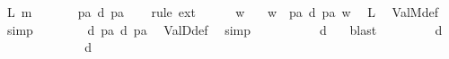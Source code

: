 \begin{isabellebody}
\ L{\isacharcolon}{\kern0pt}\ {\isachardoublequoteopen}{\isasymTurnstile}\isactrlsup m\ {\isasympsi}{\isachardoublequoteclose}\isanewline
\ \ \isamarkupfalse%
\ {\isachardoublequoteopen}{\isasympsi}\ {\isacharequal}{\kern0pt}\ {\isasymlceil}p\isactrlsup a\ {\isasymsupset}\isactrlsup d\ p\isactrlsup a{\isasymrceil}{\isachardoublequoteclose}\isanewline
\ \ \isamarkupfalse%
\ {\isacharparenleft}{\kern0pt}rule\ ext{\isacharparenright}{\kern0pt}\isanewline
\ \ \ \ \isamarkupfalse%
\ w\ \isamarkupfalse%
\ {\isachardoublequoteopen}{\isasympsi}\ w\ {\isacharequal}{\kern0pt}\ {\isasymlceil}p\isactrlsup a\ {\isasymsupset}\isactrlsup d\ p\isactrlsup a{\isasymrceil}\ w{\isachardoublequoteclose}\ \isamarkupfalse%
\ L\ \isamarkupfalse%
\ ValM{\isacharunderscore}{\kern0pt}def\ \isamarkupfalse%
\ simp\isanewline
\ \ \isamarkupfalse%
\isanewline
\ \ \isamarkupfalse%
\ \isamarkupfalse%
\ {\isachardoublequoteopen}{\isasymTurnstile}\isactrlsup d\ {\isacharparenleft}{\kern0pt}p\isactrlsup a\ {\isasymsupset}\isactrlsup d\ p\isactrlsup a{\isacharparenright}{\kern0pt}{\isachardoublequoteclose}\ \isamarkupfalse%
\ ValD{\isacharunderscore}{\kern0pt}def\ \isamarkupfalse%
\ simp\isanewline
\ \ \isamarkupfalse%
\ \isamarkupfalse%
\ {\isachardoublequoteopen}{\isasymexists}{\isasymphi}{\isachardot}{\kern0pt}\ {\isasympsi}\ {\isacharequal}{\kern0pt}\ {\isasymlceil}{\isasymphi}{\isasymrceil}\ {\isasymand}\ {\isasymTurnstile}\isactrlsup d\ {\isasymphi}{\isachardoublequoteclose}\ \isamarkupfalse%
\ blast\isanewline
{}\isamarkupfalse%
\isanewline
\ \ \isamarkupfalse%
\ {\isachardoublequoteopen}{\isasymexists}{\isasymphi}{\isachardot}{\kern0pt}\ {\isasympsi}\ {\isacharequal}{\kern0pt}\ {\isasymlceil}{\isasymphi}{\isasymrceil}\ {\isasymand}\ {\isasymTurnstile}\isactrlsup d\ {\isasymphi}{\isachardoublequoteclose}\isanewline
\ \ \isamarkupfalse%
\ \isamarkupfalse%
\ {\isasymphi}\ \ {}{\isacharcolon}{\kern0pt}\ {\isachardoublequoteopen}{\isasympsi}\ {\isacharequal}{\kern0pt}\ {\isasymlceil}{\isasymphi}{\isasymrceil}{\isachardoublequoteclose}\ \ {}{\isacharcolon}{\kern0pt}\ {\isachardoublequoteopen}{\isasymTurnstile}\isactrlsup d\ {\isasymphi}{\isachardoublequoteclose}\ \isamarkupfalse%

\end{isabellebody}
